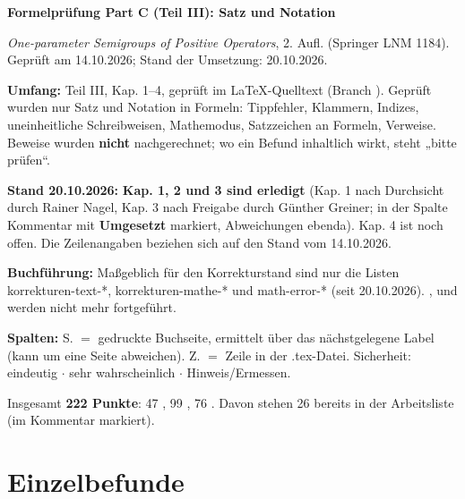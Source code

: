 \documentclass[10pt]{article}
\begin{document}
{\Large\bfseries Formelprüfung Part C (Teil III): Satz und Notation\par}
\smallskip
\emph{One-parameter Semigroups of Positive Operators}, 2. Aufl. (Springer LNM 1184). Geprüft am 14.10.2026; Stand der Umsetzung: 20.10.2026.

\textbf{Umfang:} Teil III, Kap. 1–4, geprüft im LaTeX-Quelltext (Branch ). Geprüft wurden nur Satz und Notation in Formeln: Tippfehler, Klammern, Indizes, uneinheitliche Schreibweisen, Mathemodus, Satzzeichen an Formeln, Verweise. Beweise wurden \textbf{nicht} nachgerechnet; wo ein Befund inhaltlich wirkt, steht „bitte prüfen“.

\textbf{Stand 20.10.2026:} \textbf{Kap. 1, 2 und 3 sind erledigt} (Kap. 1 nach Durchsicht durch Rainer Nagel, Kap. 3 nach Freigabe durch Günther Greiner; in der Spalte Kommentar mit \textbf{Umgesetzt} markiert, Abweichungen ebenda). Kap. 4 ist noch offen. Die Zeilenangaben beziehen sich auf den Stand vom 14.10.2026.

\textbf{Buchführung:} Maßgeblich für den Korrekturstand sind nur die Listen {korrekturen-text-*}, {korrekturen-mathe-*} und {math-error-*} (seit 20.10.2026). ,  und  werden nicht mehr fortgeführt.

\textbf{Spalten:} S. $=$ gedruckte Buchseite, ermittelt über das nächstgelegene Label (kann um eine Seite abweichen). Z. $=$ Zeile in der .tex-Datei. Sicherheit: \sichA{} eindeutig $\ensuremath{\cdot}$ \sichB{} sehr wahrscheinlich $\ensuremath{\cdot}$ \sichC{} Hinweis/Ermessen.

Insgesamt \textbf{222 Punkte}: 47 \sichA{}, 99 \sichB{}, 76 \sichC{}. Davon stehen 26 bereits in der Arbeitsliste  (im Kommentar markiert).

\section*{Einzelbefunde}
\end{document}
